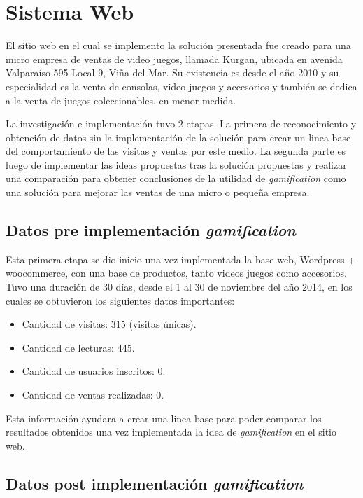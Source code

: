 \section{Sistema Web}

El sitio web en el cual se implemento la solución presentada fue creado para una micro empresa de
ventas de video juegos, llamada Kurgan, ubicada en avenida Valparaíso 595 Local 9, Viña del Mar.
Su existencia es desde el año 2010 y su especialidad es la venta de consolas, video juegos y
accesorios y también se dedica a la venta de juegos coleccionables, en menor medida.

La investigación e implementación tuvo $2$ etapas. La primera de reconocimiento y obtención de
datos sin la implementación de la solución para crear un linea base del comportamiento de las visitas
y ventas por este medio. La segunda parte es luego de implementar las ideas propuestas tras la solución
propuestas y realizar una comparación para obtener conclusiones de la utilidad de \emph{gamification}
como una solución para mejorar las ventas de una micro o pequeña empresa.

\subsection{Datos pre implementación \emph{gamification}}

Esta primera etapa se dio inicio una vez implementada la base web, Wordpress + woocommerce, con
una base de productos, tanto videos juegos como accesorios. Tuvo una duración de 30 días, desde el 1
 al 30 de noviembre del año 2014, en los cuales se obtuvieron los siguientes datos importantes:

\begin{itemize}
\item Cantidad de visitas: 315 (visitas únicas).
\item Cantidad de lecturas: 445.
\item Cantidad de usuarios inscritos: 0.
\item Cantidad de ventas realizadas: 0.
\end{itemize}

Esta información ayudara a crear una linea base para poder comparar los resultados obtenidos una vez
implementada la idea de \emph{gamification} en el sitio web.

\subsection{Datos post implementación \emph{gamification}}

